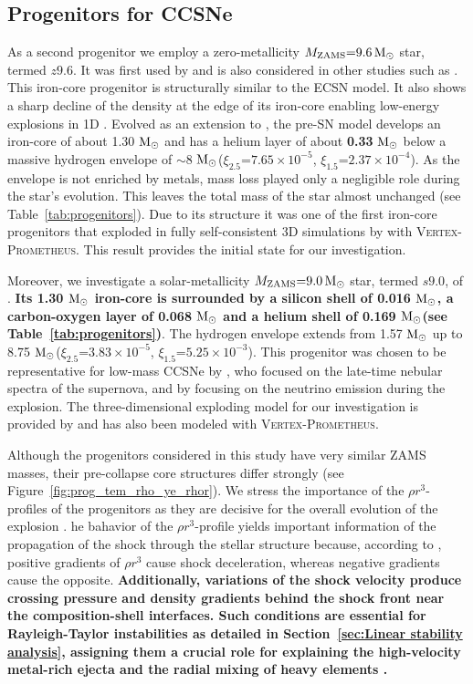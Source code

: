 \documentclass[fleqn,usenatbib]{mnras}
\newcommand{\solm}{\ensuremath{\rm{M_{\odot}}}\xspace}
\newcommand{\vertexprom}{\textsc{Vertex-Prometheus}\xspace}
\begin{document}
\subsection{Progenitors for CCSNe}
As a second progenitor we employ a zero-metallicity $M_{\text{ZAMS}}\mathord{=}9.6\,\solm$ star, termed $z9.6$. It was first used by \citet{Janka2012} and is also considered in other studies such as \citet{Mueller2013,Mueller2018}. This iron-core progenitor is structurally similar to the ECSN model. It also shows a sharp decline of the density at the edge of its iron-core enabling low-energy explosions in 1D \citep{Melson2015}. 
Evolved as an extension to \cite{Heger2010}, the pre-SN model develops an iron-core of about 1.30 \solm and has a helium layer of about \textbf{0.33} \solm below a massive hydrogen envelope of $\mathord{\sim}8$ \solm ($\xi_{2.5}\mathord{=}7.65 \times 10^{-5}$, $\xi_{1.5}\mathord{=}2.37 \times 10^{-4}$). As the envelope is not enriched by metals, mass loss played only a negligible role during the star's evolution. This leaves the total mass of the star almost unchanged (see Table~\ref{tab:progenitors}). 
Due to its structure it was one of the first iron-core progenitors that exploded in fully self-consistent 3D simulations by \cite{Melson2015a} with \vertexprom. This result provides the initial state for our investigation. 

Moreover, we investigate a solar-metallicity $M_{\text{ZAMS}} \mathord{=} 9.0 \,\solm$ star, termed $s9.0$, of \citet{Sukhbold2016}. \textbf{Its 1.30 \solm iron-core is surrounded by a silicon shell of 0.016 \solm, a carbon-oxygen layer of 0.068 \solm and a helium shell of 0.169 \solm (see Table~\ref{tab:progenitors})}. The hydrogen envelope extends from 1.57 \solm up to 8.75 \solm ($\xi_{2.5}\mathord{=}3.83 \times 10^{-5}$, $\xi_{1.5}\mathord{=}5.25 \times 10^{-3}$).
This progenitor was chosen to be representative for low-mass CCSNe by \cite{Jerkstrand2018}, who focused on the late-time nebular spectra of the supernova, and by \cite{Glas2019} focusing on the neutrino emission during the explosion. The three-dimensional exploding model for our investigation is provided by \citet{Melson2019} and has also been modeled with \vertexprom. 

Although the progenitors considered in this study have very similar ZAMS masses, their pre-collapse core structures differ strongly (see Figure~\ref{fig:prog_tem_rho_ye_rhor}).
We stress the importance of the $\rho r^3$-profiles of the progenitors as they are decisive for the overall evolution of the explosion \citep{Kifonidis2003,Wongwathanarat2015}. he bahavior of the $\rho r^3$-profile yields important information of the propagation of the shock through the stellar structure because, according to \cite{Sedov1961}, positive gradients of $\rho r^3$ cause shock deceleration, whereas negative gradients cause the opposite. \textbf{Additionally, variations of the shock velocity produce crossing pressure and density gradients behind the shock front near the composition-shell interfaces. Such conditions are essential for Rayleigh-Taylor instabilities as detailed in Section~\ref{sec:Linear stability analysis}, assigning them a crucial role for explaining the high-velocity metal-rich ejecta and the radial mixing of heavy elements \citep{Wongwathanarat2015}.}
\end{document}
